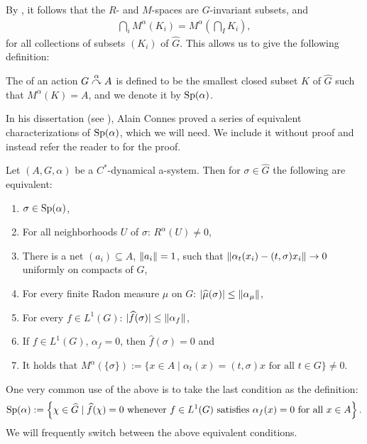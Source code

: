 By \cite[Theorem 8.1.4]{pedersenalgauto}, it follows that the $R$- and $M$-spaces are $G$-invariant subsets, and
\begin{align*}
	\bigcap_i M^\alpha(K_i) = M^\alpha\left(\bigcap_I K_i\right),
\end{align*}
for all collections of subsets $(K_i)$ of $\hat G$. This allows us to give the following definition:
\begin{definition}
	The  of an action $G \stackrel{\alpha}{\curvearrowright} A$ is defined to be the smallest closed subset $K$ of $\hat G$ such that $M^\alpha(K) = A$, and we denote it by $\mathrm{Sp}(\alpha)$.
\end{definition}
In his dissertation (see \cite{connesclassification}), Alain Connes proved a series of equivalent characterizations of $\mathrm{Sp}(\alpha)$, which we will need. We include it without proof and instead refer the reader to \cite[Proposition 8.1.9 and 8.1.8]{pedersenalgauto} for the proof.
\begin{proposition}
	Let $(A, G, \alpha)$ be a $C^*$-dynamical a-system. Then for $\sigma \in \hat G$ the following are equivalent:
	\begin{enumerate}
		\item $\sigma \in \mathrm{Sp}(\alpha)$,
		\item For all neighborhoods $U$ of $\sigma$: $R^\alpha(U) \neq 0$,
		\item There is a net $(a_i) \subseteq A$, $\left\lVert a_i \right\rVert = 1$, such that $\left\lVert\alpha_t(x_i) - (t,\sigma)x_i\right\rVert \to 0$ uniformly on compacts of $G$,
		\item For every finite Radon measure $\mu$ on $G$: $|\widehat{\mu}(\sigma)| \leq \left\lVert \alpha_\mu\right\rVert$,
		\item For every $f \in L^1(G)$: $|\widehat{f} (\sigma)| \leq \left\lVert \alpha_f\right\rVert$,
		\item If $f \in L^1(G)$, $\alpha_f=0$, then $\hat f(\sigma)=0$ and
		\item It holds that $M^{\alpha}(\{\sigma\}) := \{x \in A \mid  \alpha_t(x) = (t,\sigma)x \text{ for all } t \in G\} \neq 0$.
	\end{enumerate}
\end{proposition}
One very common use of the above is to take the last condition as the definition:
\begin{align*}
		\mathrm{Sp}(\alpha) := \left\{ \chi \in \widehat{G} \mid \widehat{f}(\chi) = 0 \text{ whenever } f \in L^1(G) \text{ satisfies } \alpha_f(x) = 0 \text{ for all } x \in A  \right\}.
	\end{align*}
We will frequently switch between the above equivalent conditions.

